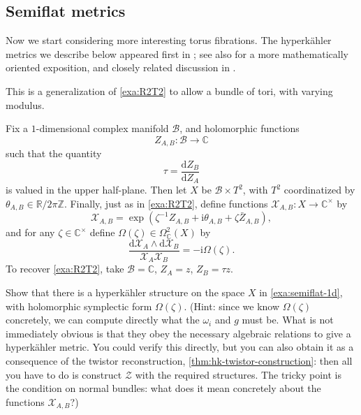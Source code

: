 \documentclass[12pt,letterpaper,reqno]{article}
\numberwithin{equation}{section}
\newcommand{\cB}{\ensuremath{\mathcal B}}
\newcommand{\cZ}{\ensuremath{\mathcal Z}}
\newcommand{\cX}{\ensuremath{\mathcal X}}
\newcommand{\R}{\ensuremath{\mathbb R}}
\newcommand{\C}{\ensuremath{\mathbb C}}
\newcommand{\Z}{\ensuremath{\mathbb Z}}
\newcommand{\hk}{hyperk\"ahler\xspace}
\newcommand{\I}{{\mathrm i}}
\newcommand{\de}{\mathrm{d}}
\begin{document}
\subsection{Semiflat metrics}

Now we start considering more interesting torus fibrations.
The \hk metrics we describe below appeared first in
\cite{Cecotti:1989qn}; see also \cite{Freed:1997dp}
for a more mathematically oriented exposition,
and closely related discussion in \cite{Hitchin:2005uu}.

\begin{example} \label{exa:semiflat-1d}
This is a generalization of \autoref{exa:R2T2} to allow a
bundle of tori, with varying modulus.

Fix a $1$-dimensional complex manifold $\cB$,
and holomorphic functions 
\begin{equation}
  Z_{A,B}: \cB \to \C
\end{equation}
such that the quantity
\begin{equation}
  \tau = \frac{\de Z_B}{\de Z_A}
\end{equation}
is valued in the upper half-plane.
Then let $X$ be $\cB \times T^2$, with $T^2$
coordinatized by $\theta_{A,B} \in \R / 2 \pi \Z$.
Finally, just as in \autoref{exa:R2T2}, define functions
$\cX_{A,B}: X \to \C^\times$ by
\begin{equation}
  \cX_{A,B} = \exp \left(\zeta^{-1} Z_{A,B} + \I \theta_{A,B} + \zeta\bar{Z}_{A,B} \right),
\end{equation}
and for any $\zeta \in \C^\times$ 
define $\Omega(\zeta) \in \Omega^2_\C(X)$ by
\begin{equation}
  \frac{\de \cX_A \wedge \de \cX_B}{\cX_A \cX_B} = -\I \Omega(\zeta).
\end{equation}
To recover \autoref{exa:R2T2}, take $\cB = \C$, 
$Z_A = z$, $Z_B = \tau z$.
\end{example}

\begin{exercise} \label{exc:semiflat-1d-hk} Show that there is a \hk structure on the 
space $X$ in \autoref{exa:semiflat-1d}, with holomorphic symplectic
form $\Omega(\zeta)$. 
(Hint: since we know $\Omega(\zeta)$ concretely, we can compute
directly what the $\omega_i$ and $g$ must be. What is not immediately
obvious is that they obey the necessary algebraic relations to
give a \hk metric. You could verify this directly, but 
you can also obtain it as a consequence of the twistor
reconstruction, \autoref{thm:hk-twistor-construction}: then all you 
have to do is construct $\cZ$ with the required structures.
The tricky point is the condition on normal bundles: what does
it mean concretely about the functions $\cX_{A,B}$?)
\end{exercise}
\end{document}
